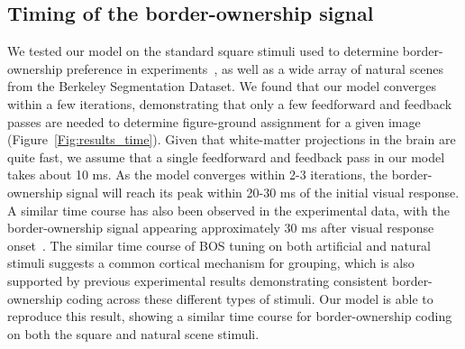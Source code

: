 \subsection{Timing of the border-ownership signal}
We tested our model on the standard square stimuli used to determine border-ownership preference in experiments~\citep{Zhou_etal00}, as well as a wide array of natural scenes from the Berkeley Segmentation Dataset. We found that our model converges within a few iterations, demonstrating that only a few feedforward and feedback passes are needed to determine figure-ground assignment for a given image (Figure~\ref{Fig:results_time}).
Given that white-matter projections in the brain are quite fast, we assume that a single feedforward and feedback pass in our model takes about 10 ms. As the model converges within 2-3 iterations, the border-ownership signal will reach its peak within 20-30 ms of the initial visual response. A similar time course has also been observed in the experimental data, with the border-ownership signal appearing approximately 30 ms after visual response onset~\citep{Williford_vonderHeydt16}.
%
The similar time course of BOS tuning on both artificial and natural stimuli suggests a common cortical mechanism for grouping, which is also supported by previous experimental results demonstrating consistent border-ownership coding across these different types of stimuli. Our model is able to reproduce this result, showing a similar time course for border-ownership coding on both the square and natural scene stimuli.

